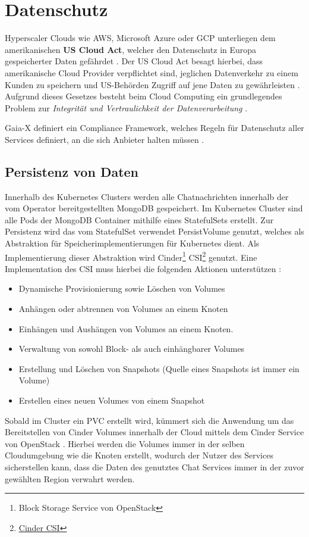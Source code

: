 \section{Datenschutz}
\label{sec:slas:datenschutz}
Hyperscaler Clouds wie \ac{AWS}, Microsoft Azure oder \ac{GCP} unterliegen dem amerikanischen \textbf{US Cloud Act}, welcher
den Datenschutz in Europa gespeicherter Daten gefährdet \cite{Kagermann2021}. Der US Cloud Act besagt hierbei,
dass amerikanische Cloud Provider verpflichtet sind, jeglichen Datenverkehr zu einem Kunden zu speichern und 
US-Behörden Zugriff auf jene Daten zu gewährleisten \cite{CloudAct2018}.
Aufgrund dieses Gesetzes besteht beim Cloud Computing ein grundlegendes Problem 
zur \emph{Integrität und Vertraulichkeit der Datenverarbeitung} \cite{Weichert2010}.

Gaia-X definiert ein Compliance Framework, welches Regeln für Datenschutz aller Services definiert, an die sich
Anbieter halten müssen \cite{}. 


\subsection{Persistenz von Daten}
\label{subsec:datenschutz:persistenz}
Innerhalb des Kubernetes Clusters werden alle Chatnachrichten innerhalb der vom Operator bereitgestellten
MongoDB gespeichert. Im Kubernetes Cluster sind alle Pods der MongoDB Container mithilfe eines StatefulSets 
erstellt. Zur Persistenz wird das vom StatefulSet verwendet PersistVolume genutzt,
welches als Abstraktion für Speicherimplementierungen für Kubernetes dient.
Als Implementierung dieser Abstraktion wird 
Cinder\footnote{Block Storage Service von OpenStack} CSI\footnote{\href{https://github.com/kubernetes/cloud-provider-openstack/tree/master/pkg/csi/cinder}{Cinder CSI}} genutzt. 
Eine Implementation des \ac{CSI} muss hierbei die folgenden Aktionen unterstützen \cite{container-storage-interface_2021}:
\begin{itemize}
  \item Dynamische Provisionierung sowie Löschen von Volumes
  \item Anhängen oder abtrennen von Volumes an einem Knoten
  \item Einhängen und Aushängen von Volumes an einem Knoten.
  \item Verwaltung von sowohl Block- als auch einhängbarer Volumes
  \item Erstellung und Löschen von Snapshots (Quelle eines Snapshots ist immer ein Volume)
  \item Erstellen eines neuen Volumes von einem Snapshot
\end{itemize}

Sobald im Cluster ein \ac{PVC} erstellt wird, kümmert sich die Anwendung um das Bereitstellen von 
Cinder Volumes innerhalb der Cloud mittels dem Cinder Service von OpenStack \cite{cinderCSI}.
Hierbei werden die Volumes immer in der selben Cloudumgebung wie die Knoten erstellt, wodurch der 
Nutzer des Services sicherstellen kann, dass die Daten des genutztes Chat Services immer in der zuvor 
gewählten Region verwahrt werden.